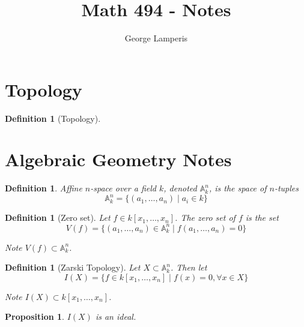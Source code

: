 \documentclass[12pt]{article}
\title{Math 494 - Notes}
\author{George Lamperis}
\date{}
\theoremstyle{mystyle}
\newtheorem{prop}[thm]{Proposition}
\newtheorem{defn}[thm]{Definition}
\newcommand{\Kn}{k[x_1, \ldots, x_n]}
\newcommand{\A}[2]{\mathbb{A}^{#1}_{#2}}
\newcommand{\Ank}{\A{n}{k}}
\begin{document}
\maketitle



\section{Topology}
\begin{defn}[Topology]
\end{defn}


\section{Algebraic Geometry Notes}
\begin{defn}
  Affine $n$-space over a field $k$, denoted $\A{n}{k}$, is the space of
  $n$-tuples
  \[ \Ank = \{(a_1, \ldots, a_n) \mid a_i \in k \}\]
\end{defn}

\begin{defn}[Zero set]
  Let $f \in \Kn$. The zero set of $f$ is the set
  \[ V(f) = \{ (a_1, \ldots, a_n) \in \Ank \mid f(a_1, \ldots, a_n) = 0 \}\]
  
  Note $V(f) \subset \Ank$.
\end{defn}

\begin{defn}[Zarski Topology]
Let $X \subset \Ank$. Then let
\[ I(X) = \{ f \in k[x_1, \ldots, x_n] \mid f(x) = 0, \forall x \in X \} \]

Note $I(X) \subset \Kn$.
\end{defn}

\begin{prop}
$I(X)$ is an ideal.
\end{prop}
\end{document}

